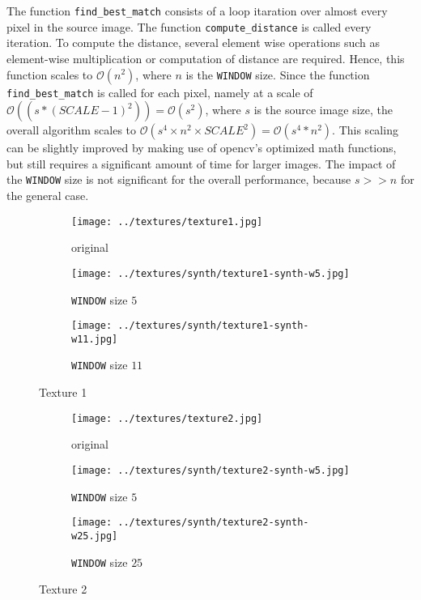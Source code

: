 \documentclass{article}
\begin{document}
The function \texttt{find\_best\_match} consists of a loop itaration over almost every pixel in the source image. The function \texttt{compute\_distance} is called every iteration. To compute the distance, several element wise operations such as element-wise multiplication or computation of distance are required. Hence, this function scales to $\mathcal{O}(n^2)$, where $n$ is the \texttt{WINDOW} size. 
Since the function \texttt{find\_best\_match} is called for each pixel, namely at a scale of $\mathcal{O}((s*(SCALE - 1)^2))=\mathcal{O}(s^2)$, where $s$ is the source image size, the overall algorithm scales to $\mathcal{O}(s^4\times n^2 \times SCALE^2)=\mathcal{O}(s^4*n^2)$. This scaling can be slightly improved by making use of opencv's optimized math functions, but still requires a significant amount of time for larger images. 
The impact of the \texttt{WINDOW} size is not significant for the overall performance, because $s>>n$ for the general case.
\begin{figure}[H]
	\begin{subfigure}{0.33\textwidth}
		\centering
		\texttt{[image: ../textures/texture1.jpg]}
		\caption{original}
		\label{text-1-orig}
	\end{subfigure}%
	\begin{subfigure}{0.33\textwidth}
		\centering
		\texttt{[image: ../textures/synth/texture1-synth-w5.jpg]}
		\caption{\texttt{WINDOW} size $5$}
		\label{text-1-w5}
	\end{subfigure}%
	\begin{subfigure}{0.33\textwidth}
		\centering
		\texttt{[image: ../textures/synth/texture1-synth-w11.jpg]}
		\caption{\texttt{WINDOW} size $11$}
		\label{text-1-w11}
	\end{subfigure}%
	\caption{Texture 1}
	\label{text-1}
\end{figure}



\begin{figure}[H]
	\begin{subfigure}{0.33\textwidth}
		\centering
		\texttt{[image: ../textures/texture2.jpg]}
		\caption{original}
		\label{text-2-orig}
	\end{subfigure}%
	\begin{subfigure}{0.33\textwidth}
		\centering
		\texttt{[image: ../textures/synth/texture2-synth-w5.jpg]}
		\caption{\texttt{WINDOW} size $5$}
		\label{text-2-w5}
	\end{subfigure}%
	\begin{subfigure}{0.33\textwidth}
		\centering
		\texttt{[image: ../textures/synth/texture2-synth-w25.jpg]}
		\caption{\texttt{WINDOW} size $25$}
		\label{text-2-w25}
	\end{subfigure}%
	\caption{Texture 2}
	\label{text-2}
\end{figure}
\end{document}
